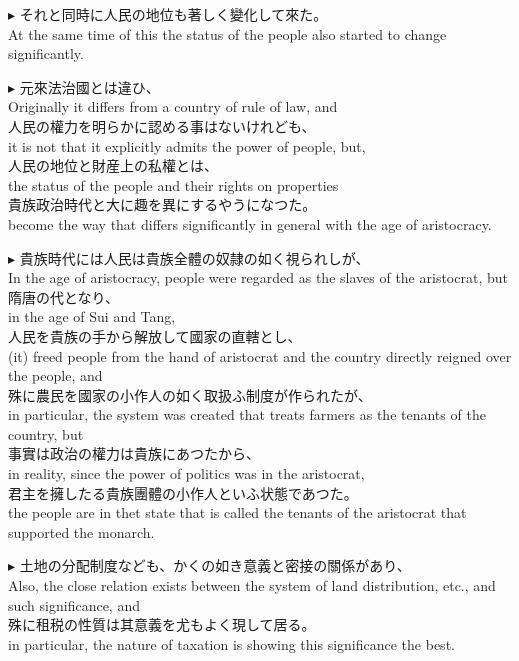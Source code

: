 \documentclass{ctexart}
\makeatletter
\newcommand*{\shifttext}[1]{%
  \settowidth{\@tempdima}{#1}%
  \hspace{-\@tempdima}#1%
}
\newcommand{\plabel}[1]{%
\shifttext{\textbf{#1}\quad}%
}
\newcommand{\prule}{%
\begin{center}%
\hdashrule[0.5ex]{.99\linewidth}{1pt}{1pt 2.5pt}%
\end{center}%
}
\makeatother
\begin{document}
\prule

\plabel{$\blacktriangleright$}%
それと同時に人民の地位も著しく變化して來た。\\
At the same time of this the status of the people also started to change significantly.

\vspace{1em}
\plabel{$\blacktriangleright$}%
元來法治國とは違ひ、\\
Originally it differs from a country of rule of law, and\\
人民の權力を明らかに認める事はないけれども、\\
it is not that it explicitly admits the power of people, but,\\
人民の地位と財産上の私權とは、\\
the status of the people and their rights on properties\\
貴族政治時代と大に趣を異にするやうになつた。\\
become the way that differs significantly in general with the age of aristocracy.

\vspace{1em}
\plabel{$\blacktriangleright$}%
貴族時代には人民は貴族全體の奴隷の如く視られしが、\\
In the age of aristocracy, people were regarded as the slaves of the aristocrat, but\\
隋唐の代となり、\\
in the age of Sui and Tang,\\
人民を貴族の手から解放して國家の直轄とし、\\
(it) freed people from the hand of aristocrat and the country directly reigned over the people, and\\
殊に農民を國家の小作人の如く取扱ふ制度が作られたが、\\
in particular, the system was created that treats farmers as the tenants of the country, but\\
事實は政治の權力は貴族にあつたから、\\
in reality, since the power of politics was in the aristocrat,\\
君主を擁したる貴族團體の小作人といふ状態であつた。\\
the people are in thet state that is called the tenants of the aristocrat that supported the monarch.

\vspace{1em}
\plabel{$\blacktriangleright$}%
土地の分配制度なども、かくの如き意義と密接の關係があり、\\
Also, the close relation exists between the system of land distribution, etc., and such significance, and\\
殊に租税の性質は其意義を尤もよく現して居る。\\
in particular, the nature of taxation is showing this significance the best.
\end{document}
